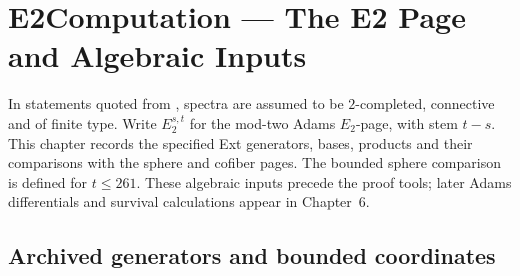 \chapter{E2Computation --- The E2 Page and Algebraic Inputs}
In statements quoted from \cite{LWX126}, spectra are assumed to be $2$-completed, connective and of finite type. Write $E_2^{s,t}$ for the mod-two Adams $E_2$-page, with stem $t-s$. This chapter records the specified Ext generators, bases, products and their comparisons with the sphere and cofiber pages. The bounded sphere comparison is defined for $t\leq261$. These algebraic inputs precede the proof tools; later Adams differentials and survival calculations appear in Chapter~6.



\section{Archived generators and bounded coordinates}


